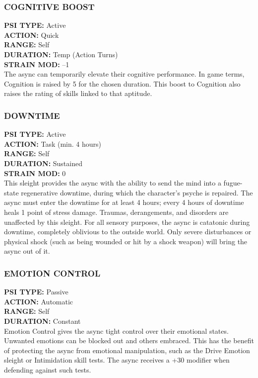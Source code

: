 \subsubsection{COGNITIVE BOOST} \textbf{PSI TYPE:} Active \\ \textbf{ACTION:} Quick \\ \textbf{RANGE:} Self \\ \textbf{DURATION:} Temp (Action Turns) \\ \textbf{STRAIN MOD:} –1 \\ The async can temporarily elevate their cognitive performance. In game terms, Cognition is raised by 5 for the chosen duration. This boost to Cognition also raises the rating of skills linked to that aptitude. 

\subsubsection{DOWNTIME} \textbf{PSI TYPE:} Active \\ \textbf{ACTION:} Task (min. 4 hours) \\ \textbf{RANGE:} Self \\ \textbf{DURATION:} Sustained \\ \textbf{STRAIN MOD:} 0 \\ This sleight provides the async with the ability to send the mind into a fugue-state regenerative downtime, during which the character’s psyche is repaired. The async must enter the downtime for at least 4 hours; every 4 hours of downtime heals 1 point of stress damage. Traumas, derangements, and disorders are unaffected by this sleight. For all sensory purposes, the async is catatonic during downtime, completely oblivious to the outside world. Only severe disturbances or physical shock (such as being wounded or hit by a shock weapon) will bring the async out of it. 

\subsubsection{EMOTION CONTROL} \textbf{PSI TYPE:} Passive \\ \textbf{ACTION:} Automatic \\ \textbf{RANGE:} Self \\ \textbf{DURATION:} Constant \\ Emotion Control gives the async tight control over their emotional states. Unwanted emotions can be blocked out and others embraced. This has the benefit of protecting the async from emotional manipulation, such as the Drive Emotion sleight or Intimidation skill tests. The async receives a +30 modifier when defending against such tests. 

